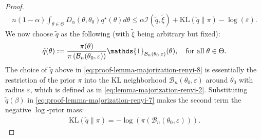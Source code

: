 \documentclass[12pt]{article}
\numberwithin{equation}{section}
\begin{document}
\begin{proof}
%
\begin{align}\label{eq:proof-lemma-majorization-renyi-7}
n(1-\alpha)\int_{\theta\in \Theta}D_{\alpha}(\theta, \theta_{0})q^{\star}(\theta)d\theta
\leq \alpha \mathcal{I}(\tilde{q}, \tilde{\xi})+ \mathrm{KL}(\tilde{q} \parallel \pi) - \log\left(\varepsilon\right).
\end{align}
%
We now choose $\tilde{q}$ as the following (with $\tilde{\xi}$ being arbitrary but fixed):
%
\begin{align}\label{eq:proof-lemma-majorization-renyi-8}
    \begin{split}
        \tilde{q}(\theta) := \frac{\pi(\theta)}{\pi\left(\mathcal{B}_n(\theta_0, \varepsilon)\right)}\mathds{1}_{\mathcal{B}_n(\theta_0, \varepsilon)}(\theta),\quad \text{for all}\hspace{1mm}\theta\in \Theta.
    \end{split}
\end{align}
The choice of $\tilde{q}$ above in \eqref{eq:proof-lemma-majorization-renyi-8} is essentially the restriction of the prior $\pi$ into the KL neighborhood $\mathcal{B}_n(\theta_0, \varepsilon)$ around $\theta_0$ with radius $\varepsilon$, which is defined as in \eqref{eq:lemma-majorization-renyi-2}. 
Substituting $\tilde{q}(\beta)$ in \eqref{eq:proof-lemma-majorization-renyi-7} makes the second term the negative $\log$-prior mass:
%
\begin{align}\label{eq:proof-lemma-majorization-renyi-9}
    \mathrm{KL}(\tilde{q} \parallel \pi) = -\log(\pi(\mathcal{B}_n(\theta_0, \varepsilon))).
\end{align}
%


\end{proof}
\end{document}
